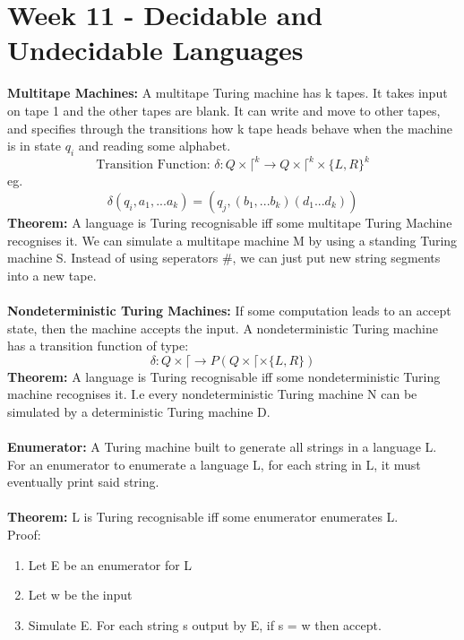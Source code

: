 \documentclass[a4paper,10pt]{article}
\begin{document}
\section*{Week 11 - Decidable and Undecidable Languages}
\textcolor{Peach}{\textbf{Multitape Machines:}} A multitape Turing machine has k tapes. It takes input on tape 1 and the other tapes are blank. It can write and move to other tapes, and specifies through the transitions how k tape heads behave when the machine is in state $q_{i}$ and reading some alphabet. \\
\begin{equation*}
\textrm{Transition Function: } \delta: Q \times \lceil^{k} \rightarrow Q \times \lceil^{k} \times \{L,R\}^{k}
\end{equation*}
eg. 
\begin{equation*}
\delta (q_{i}, a_{1}, ... a_{k}) = (q_{j}, (b_{1}, ... b_{k})(d_{1}...d_{k}))
\end{equation*}
\textcolor{Peach}{\textbf{Theorem:}} A language is Turing recognisable iff some multitape Turing Machine recognises it. We can simulate a multitape machine M by using a standing Turing machine S. Instead of using seperators $\#$, we can just put new string segments into a new tape.  \\\\
\textcolor{Peach}{\textbf{Nondeterministic Turing Machines:}} If some computation leads to an accept state, then the machine accepts the input. A nondeterministic Turing machine has a transition function of type: \\
\begin{equation*}
\delta: Q \times \lceil \rightarrow P(Q \times \lceil \times \{L,R\})
\end{equation*}
\textcolor{Peach}{\textbf{Theorem:}} A language is Turing recognisable iff some nondeterministic Turing machine recognises it. I.e every nondeterministic Turing machine N can be simulated by a deterministic Turing machine D. \\\\
\textcolor{Peach}{\textbf{Enumerator:}} A Turing machine built to generate all strings in a language L. For an enumerator to enumerate a language L, for each string in L, it must eventually print said string. \\\\
\textcolor{Peach}{\textbf{Theorem:}} L is Turing recognisable iff some enumerator enumerates L. \\
Proof: \\
\begin{enumerate}
\item Let E be an enumerator for L
\item Let w be the input
\item Simulate E. For each string s output by E, if s = w then accept. 
\end{enumerate}
\end{document}
